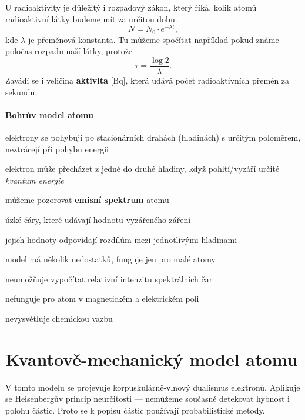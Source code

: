 \documentclass[DIV=8]{scrreprt}
\begin{document}
U radioaktivity je důležitý i rozpadový zákon, který říká, kolik atomů radioaktivní látky budeme mít za určitou dobu.
\[N = N_0 \cdot e^{-\lambda t},\]
kde \(\lambda\) je přeměnová konstanta. Tu můžeme spočítat například pokud známe poločas rozpadu naší látky, protože
\[\tau = \frac{\log 2}{\lambda}.\]
Zavádí se i veličina \textbf{aktivita} [Bq], která udává počet radioaktivních přeměn za sekundu.

\paragraph{Bohrův model atomu}
\begin{myItemize}[nosep]
    \item elektrony se pohybují po stacionárních drahách (hladinách) s určitým poloměrem, neztrácejí při pohybu energii
    \item elektron může přecházet z jedné do druhé hladiny, když pohltí/vyzáří určité \emph{kvantum energie}
    \item můžeme pozorovat \textbf{emisní spektrum} atomu
\begin{myItemize}[nosep]
    \item úzké čáry, které udávají hodnotu vyzářeného záření
    \item jejich hodnoty odpovídají rozdílům mezi jednotlivými hladinami
\end{myItemize}

    \item model má několik nedostatků, funguje jen pro malé atomy
\begin{myItemize}[nosep]
    \item neumožňuje vypočítat relativní intenzitu spektrálních čar
    \item nefunguje pro atom v magnetickém a elektrickém poli
    \item nevysvětluje chemickou vazbu
\end{myItemize}

\end{myItemize}



\section{Kvantově-mechanický model atomu} \label{Kvantově-mechanický model atomu} \FloatBarrier


V tomto modelu se projevuje korpuskulárně-vlnový dualismus elektronů. Aplikuje se Heisenbergův princip neurčitosti --- nemůžeme současně detekovat hybnost i polohu částic. Proto se k popisu částic používají probabilistické metody.
\end{document}
